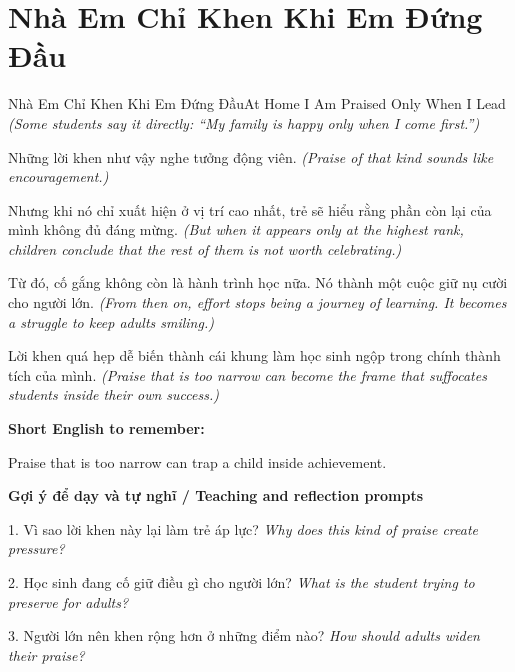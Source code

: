 \section{Nhà Em Chỉ Khen Khi Em Đứng Đầu}
\begin{truyen}{Nhà Em Chỉ Khen Khi Em Đứng Đầu}{At Home I Am Praised Only When I Lead}
\textit{(Some students say it directly: “My family is happy only when I come first.”)}

Những lời khen như vậy nghe tưởng động viên.
\textit{(Praise of that kind sounds like encouragement.)}

Nhưng khi nó chỉ xuất hiện ở vị trí cao nhất, trẻ sẽ hiểu rằng phần còn lại của mình không đủ đáng mừng.
\textit{(But when it appears only at the highest rank, children conclude that the rest of them is not worth celebrating.)}

Từ đó, cố gắng không còn là hành trình học nữa. Nó thành một cuộc giữ nụ cười cho người lớn.
\textit{(From then on, effort stops being a journey of learning. It becomes a struggle to keep adults smiling.)}

\end{truyen}

\begin{baihoc}
Lời khen quá hẹp dễ biến thành cái khung làm học sinh ngộp trong chính thành tích của mình.
\textit{(Praise that is too narrow can become the frame that suffocates students inside their own success.)}
\end{baihoc}

\begin{ghinhoanh}
\textbf{Short English to remember:}

Praise that is too narrow can trap a child inside achievement.

\end{ghinhoanh}

\begin{tuhocnhanh}
\textbf{Gợi ý để dạy và tự nghĩ / Teaching and reflection prompts}

1. Vì sao lời khen này lại làm trẻ áp lực? \textit{Why does this kind of praise create pressure?}

2. Học sinh đang cố giữ điều gì cho người lớn? \textit{What is the student trying to preserve for adults?}

3. Người lớn nên khen rộng hơn ở những điểm nào? \textit{How should adults widen their praise?}
\end{tuhocnhanh}
\ngancach

